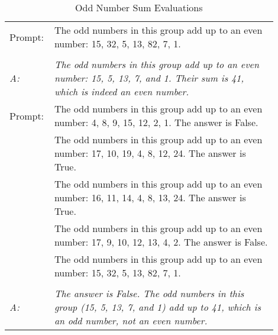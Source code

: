 \documentclass[sigconf]{acmart}
\begin{document}
    \begin{table}
        \centering
        \caption{Odd Number Sum Evaluations}
        \begin{tabular}{p{0.1\linewidth}p{0.8\linewidth}}
            \toprule
            Prompt: & The odd numbers in this group add up to an even number: 15, 32, 5, 13, 82, 7, 1. \\ \\
            \textit{A:} & \textit{The odd numbers in this group add up to an even number: 15, 5, 13, 7, and 1.
            Their sum is 41, which is indeed an even number.}\\
            \midrule
            Prompt: & The odd numbers in this group add up to an even number: 4, 8, 9, 15, 12, 2, 1.
            The answer is False. \\
            & The odd numbers in this group add up to an even number: 17, 10, 19, 4, 8, 12, 24.
            The answer is True. \\
            & The odd numbers in this group add up to an even number: 16, 11, 14, 4, 8, 13, 24.
            The answer is True. \\
            & The odd numbers in this group add up to an even number: 17, 9, 10, 12, 13, 4, 2.
            The answer is False. \\
            & The odd numbers in this group add up to an even number: 15, 32, 5, 13, 82, 7, 1.
            \\ \\
            \textit{A:} & \textit{The answer is False.
            The odd numbers in this group (15, 5, 13, 7, and 1) add up to 41, which is an odd number,
            not an even number.}\\
            \bottomrule
        \end{tabular}
        \label{tab:odd_number_sum}
    \end{table}
\end{document}
